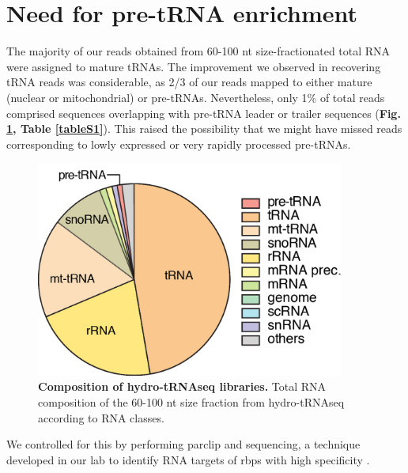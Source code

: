 \documentclass[12pt]{rockefeller}
\begin{document}
\section{Need for pre-tRNA enrichment}
The majority of our reads obtained from 60-100 nt size-fractionated total RNA were assigned to mature tRNAs. The improvement we observed in recovering tRNA reads was considerable, as 2/3 of our reads mapped to either mature (nuclear or mitochondrial) or pre-tRNAs. Nevertheless, only 1\% of total reads comprised sequences overlapping with pre-tRNA leader or trailer sequences (\textbf{Fig. \ref{paper2a}, Table \ref{tableS1}}). This raised the possibility that we might have missed reads corresponding to lowly expressed or very rapidly processed pre-tRNAs.
\begin{figure}[!ht]%
\centering
\includegraphics[width=4in]{paper2a.png}%
\caption[Composition of hydro-tRNAseq libraries]{\textbf{Composition of hydro-tRNAseq libraries.} Total RNA composition of the 60-100 nt size fraction from hydro-tRNAseq according to RNA classes.}
\centering
\label{paper2a}%
\end{figure}
We controlled for this by performing \gls{parclip} and sequencing, a technique developed in our lab to identify RNA targets of \glspl{rbp} with high specificity \cite{Hafner:2010kr}. 
\end{document}
